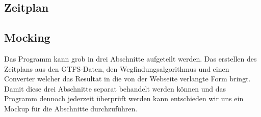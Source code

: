 \subsection{Zeitplan}

\subsection{Mocking}
Das Programm kann grob in drei Abschnitte aufgeteilt werden. Das erstellen des Zeitplans aus den GTFS-Daten, den Wegfindungsalgorithmus und einen Converter welcher das Resultat in die von der Webseite verlangte Form bringt. Damit diese drei Abschnitte separat behandelt werden können und das Programm dennoch jederzeit überprüft werden kann entschieden wir uns ein Mockup für die Abschnitte durchzuführen.


